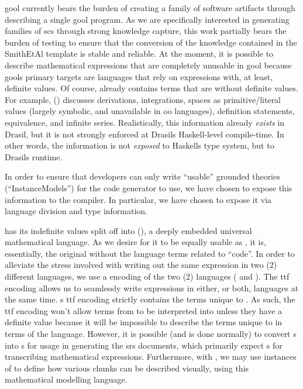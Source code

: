 \acs{gool} currently bears the burden of creating a family of software artifacts
through describing a single \acs{gool} program. As we are specifically
interested in generating families of \acs{scs} through strong knowledge capture,
this work partially bears the burden of testing to ensure that the conversion of
the knowledge contained in the SmithEtAl template \cite{SmithAndLai2005} is
stable and reliable. At the moment, it is possible to describe mathematical
expressions that are completely unusable in \acs{gool} because \acsp{gool}
primary targets are languages that rely on expressions with, at least, definite
values. Of course, \Expr{} already contains terms that are without definite
values. For example, \Expr{} () discusses derivations,
integrations, spaces as primitive/literal values (largely symbolic, and
unavailable in \acs{oo} languages), definition statements, equivalence, and infinite series. Realistically, this information
already \textit{exists} in Drasil, but it is not strongly enforced at Drasils
Haskell-level compile-time. In other words, the information is not
\textit{exposed} to Haskells type system, but to Drasils runtime.

In order to ensure that developers can only write ``usable'' grounded theories
(``InstanceModels'') for the code generator to use, we have chosen to expose
this information to the compiler. In particular, we have chosen to expose it via
language division and type information.

\languageDivision{}


\Expr{} has its indefinite values split off into \ModelExpr{}
(), a deeply embedded universal mathematical
language. As we desire for it to be equally usable as \Expr{}, it is,
essentially, the original \Expr{} without the language terms related to
``code''. In order to alleviate the stress involved with
writing out the same expression in two (2) different languages, we use a
 encoding of the two (2) languages ( and
). The \acs{ttf} encoding allows us to
seamlessly write expressions in either, or both, languages at the same time.
\ModelExpr{}s \acs{ttf} encoding strictly contains the terms unique to
\ModelExpr{}. As such, the \acs{ttf} encoding won't allow terms from
\ModelExpr{} to be interpreted into \Expr{} unless they have a definite value
because it will be impossible to describe the terms unique to \ModelExpr{} in
terms of the \Expr{} language. However, it is possible (and is done normally) to
convert \Expr{}s into \ModelExpr{}s for usage in generating the \acs{srs}
documents, which primarily expect \ModelExpr{}s for transcribing mathematical
expressions. Furthermore, with \ModelExpr{}, we may use instances of  to define how various chunks can be described
visually, using this mathematical modelling language.

